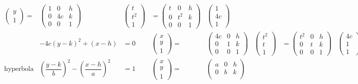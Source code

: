 \documentclass[
]{book}
\theoremstyle{definition}
\theoremstyle{definition}
\theoremstyle{definition}
\theoremstyle{definition}
\theoremstyle{remark}
\begin{document}
\[\begin{array}{cccccccc}
\begin{pmatrix}
y\\
1
\end{pmatrix}= & \begin{pmatrix}1 & 0 & h\\
0 & 4c & k\\
0 & 0 & 1
\end{pmatrix} & \begin{pmatrix}t\\
t^{2}\\
1
\end{pmatrix} & =\begin{pmatrix}t & 0 & h\\
0 & t^{2} & k\\
0 & 0 & 1
\end{pmatrix} & \begin{pmatrix}1\\
4c\\
1
\end{pmatrix}\\
 & -4c\left(y-k\right)^{2}+\left(x-h\right) & =0 & \begin{pmatrix}x\\
y\\
1
\end{pmatrix}= & \begin{pmatrix}4c & 0 & h\\
0 & 1 & k\\
0 & 0 & 1
\end{pmatrix} & \begin{pmatrix}t^{2}\\
t\\
1
\end{pmatrix} & =\begin{pmatrix}t^{2} & 0 & h\\
0 & t & k\\
0 & 0 & 1
\end{pmatrix} & \begin{pmatrix}4c\\
1\\
1
\end{pmatrix}\\
\text{hyperbola} & \left(\dfrac{y-k}{b}\right)^{2}-\left(\dfrac{x-h}{a}\right)^{2} & =1 & \begin{pmatrix}x\\
y\\
1
\end{pmatrix}= & \begin{pmatrix}a & 0 & h\\
0 & b & k\\

\end{pmatrix}
\end{array}\]
\end{document}
